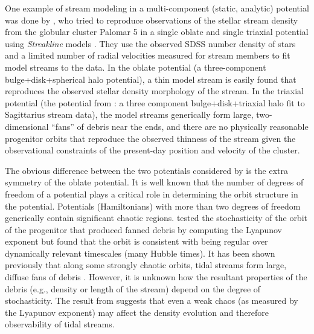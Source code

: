 \documentclass[letterpaper,12pt,preprint]{aastex}
\begin{document}
One example of stream modeling in a multi-component (static, analytic) potential was done by \citet{pearson15}, who tried to reproduce observations of the stellar stream density from the globular cluster Palomar 5 in a single oblate and single triaxial potential using \emph{Streakline} models \citep{kuepper12}. They use the observed SDSS number density of stars and a limited number of radial velocities measured for stream members to fit model streams to the data. In the oblate potential (a three-component bulge+disk+spherical halo potential), a thin model stream is easily found that reproduces the observed stellar density morphology of the stream. In the triaxial potential (the potential from \cite{law10}: a three component bulge+disk+triaxial halo fit to Sagittarius stream data), the model streams generically form large, two-dimensional ``fans'' of debris near the ends, and there are no physically reasonable progenitor orbits that reproduce the observed thinness of the stream given the observational constraints of the present-day position and velocity of the cluster. %

The obvious difference between the two potentials considered by \citet{pearson15} is the extra symmetry of the oblate potential. It is well known that the number of degrees of freedom of a potential plays a critical role in determining the orbit structure in the potential. Potentials (Hamiltonians) with more than two degrees of freedom generically contain significant chaotic regions. \citet{pearson15} tested the stochasticity of the orbit of the progenitor that produced fanned debris by computing the Lyapunov exponent but found that the orbit is consistent with being regular over dynamically relevant timescales (many Hubble times). It has been shown previously that along some strongly chaotic orbits, tidal streams form large, diffuse fans of debris \citep[e.g.,][]{fardal14}. However, it is unknown how the resultant properties of the debris (e.g., density or length of the stream) depend on the degree of stochasticity. The result from \citet{pearson15} suggests that even a weak chaos (as measured by the Lyapunov exponent) may affect the density evolution and therefore observability of tidal streams. 
\end{document}
